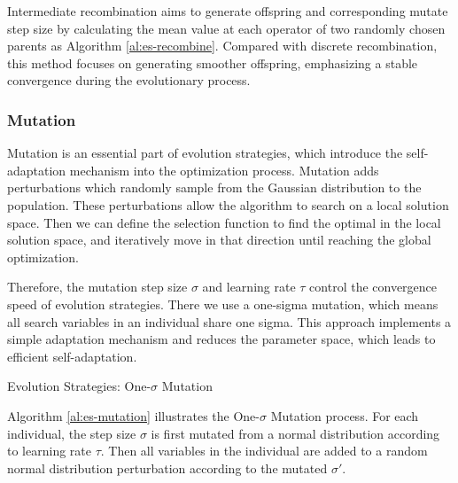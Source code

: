 \documentclass{article}
\begin{document}
Intermediate recombination aims to generate offspring and corresponding mutate step size by calculating the mean value at each operator of two randomly chosen parents as Algorithm \ref{al:es-recombine}. Compared with discrete recombination, this method focuses on generating smoother offspring, emphasizing a stable convergence during the evolutionary process.

\subsubsection{Mutation}

Mutation is an essential part of evolution strategies, which introduce the self-adaptation mechanism into the optimization process. Mutation adds perturbations which randomly sample from the Gaussian distribution to the population. These perturbations allow the algorithm to search on a local solution space. Then we can define the selection function to find the optimal in the local solution space, and iteratively move in that direction until reaching the global optimization. 

Therefore, the mutation step size $\sigma$ and learning rate $\tau$ control the convergence speed of evolution strategies. There we use a one-sigma mutation, which means all search variables in an individual share one sigma. This approach implements a simple adaptation mechanism and reduces the parameter space, which leads to efficient self-adaptation. 


\begin{algorithm}[!ht]
\SetAlgoLined
{}
\BlankLine
{}

\caption{Evolution Strategies: One-\(\sigma\) Mutation}\label{al:es-mutation}
\end{algorithm}

Algorithm \ref{al:es-mutation} illustrates the One-\(\sigma\) Mutation process. For each individual, the step size $\sigma$ is first mutated from a normal distribution according to learning rate $\tau$. Then all variables in the individual are added to a random normal distribution perturbation according to the mutated $\sigma'$.
\end{document}
